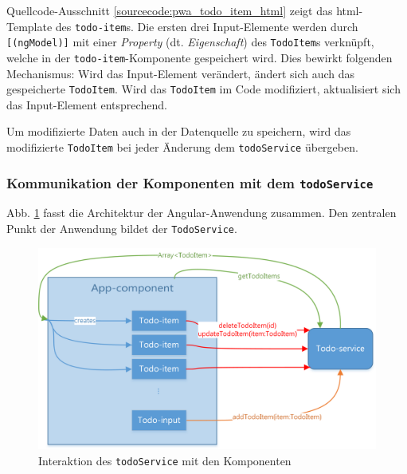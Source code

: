 \begin{description}
	\begin{minipage}{\linewidth}
		\inputminted{ng2}{sourcecode/pwa_todo_item.html}
		\vspace{-0.5cm}
		\label{sourcecode:pwa_todo_item_html}
	\end{minipage}
	
	\vspace{0.5cm}
	Quellcode-Ausschnitt \ref{sourcecode:pwa_todo_item_html} zeigt das \ac{html}-Template des \texttt{todo-item}s. Die ersten drei Input-Elemente werden durch \texttt{[(ngModel)]} mit einer \textit{Property} (dt. \textit{Eigenschaft}) des \texttt{TodoItem}s verknüpft, welche in der \texttt{todo-item}-Komponente gespeichert wird. Dies bewirkt folgenden Mechanismus: Wird das Input-Element verändert, ändert sich auch das gespeicherte \texttt{TodoItem}. Wird das \texttt{TodoItem} im Code modifiziert, aktualisiert sich das Input-Element entsprechend.
	
	Um modifizierte Daten auch in der Datenquelle zu speichern, wird das modifizierte \texttt{TodoItem} bei jeder Änderung dem \texttt{todoService} übergeben.
	
\end{description}

\subsubsection{Kommunikation der Komponenten mit dem \texttt{todoService}}

Abb. \ref{fig:pwa_todo_service} fasst die Architektur der Angular-Anwendung zusammen. Den zentralen Punkt der Anwendung bildet der \texttt{TodoService}. \newpage
\begin{figure}[h!]
	\includegraphics[width=\textwidth]{img/pwa_components.png}
	\centering
	\caption{Interaktion des \texttt{todoService} mit den Komponenten}
	\label{fig:pwa_todo_service}
\end{figure}



